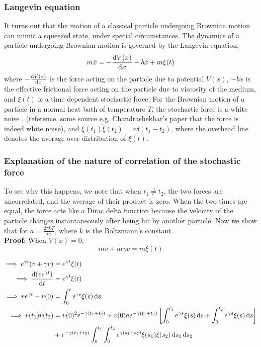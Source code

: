 \documentclass[12pt, twoside]{article}
\begin{document}
\subsubsection{Langevin equation}
It turns out that the motion of a classical particle undergoing Brownian motion can mimic a squeezed state, under special circumstances. The dynamics of a particle undergoing Brownian motion is governed by the Langevin equation,\begin{equation}\label{eq:Langevin}m \ddot{x} = -\derivative{V(x)}{x} - b \dot{x} + m \xi(t)\end{equation} where $-\derivative{V(x)}{x}$ is the force acting on the particle due to potential $V(x)$, $-b\dot{x}$ is the effective frictional force acting on the particle due to viscosity of the medium, and $\xi(t)$ is a time dependent stochastic force.
For the Brownian motion of a particle in a normal heat bath of temperature $T$, the stochastic force is a white noise \cite{wikipedia_white_noise}. (reference. some source e.g. Chandrashekhar's paper that the force is indeed white noise), and $\overline{\xi(t_1)\xi(t_2)} = a \delta(t_1 - t_2)$, where the overhead line denotes the average over distribution of $\xi(t)$.
\subsubsection{Explanation of the nature of correlation of the stochastic force}\label{fluctuation_dissipation_proof} To see why this happens, we note that when $t_1 \neq t_2$, the two forces are uncorrelated, and the average of their product is zero. When the two times are equal, the force acts like a Dirac delta function because the velocity of the particle changes instantaneously after being hit by another particle. Now we show that for $a = \frac{2 \gamma k T}{m}$, where $k$ is the Boltzmann's constant.\\
\textbf{Proof}: When $V(x) = 0$,\begin{equation}\label{eq:lang_no_pot}
	m\dot{v}+m\gamma v = m \xi(t)
\end{equation} 

$\begin{aligned}\implies e^{\gamma t}(\dot{v}+\gamma v) &= e^{\gamma t} \xi(t) \\ \implies \derivative{(ve^{\gamma t})}{t} &= e^{\gamma t} \xi(t)\\ \implies ve^{\gamma t} - v(0) &= \int_{0}^{t} e^{\gamma s} \xi(s) \dd{s} \\ \implies v(t_1) v(t_2) &= v(0)^2 e^{-\gamma(t_1 + t_2)} + v(0) a e^{-\gamma(t_1 + t_2)} \left[\int_{0}^{t_1} e^{\gamma s} \xi(s) \dd{s} + \int_{0}^{t_2} e^{\gamma s} \xi(s) \dd{s}\right] \\&+ e^{-\gamma(t_1 + t_2)} \int_{0}^{t_1}\int_{0}^{t_2} e^{\gamma(s_1 + s_2)} \xi(s_1)\xi(s_2) \dd{s_1} \dd{s_2} \end{aligned}$
\end{document}
